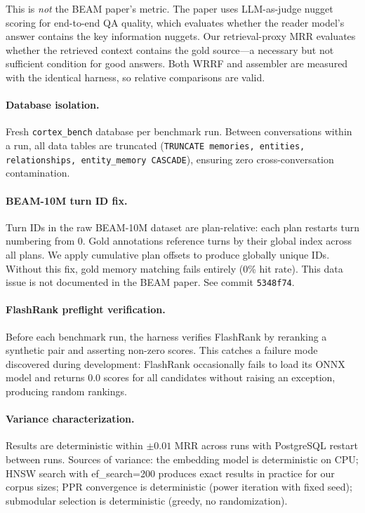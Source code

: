 \documentclass[11pt]{article}
\begin{document}
This is \emph{not} the BEAM paper's metric.  The paper uses
LLM-as-judge nugget scoring for end-to-end QA quality, which evaluates
whether the reader model's answer contains the key information nuggets.
Our retrieval-proxy MRR evaluates whether the retrieved context
contains the gold source---a necessary but not sufficient condition
for good answers.  Both WRRF and assembler are measured with the
identical harness, so relative comparisons are valid.

\paragraph{Database isolation.}
Fresh \texttt{cortex\_bench} database per benchmark run.  Between
conversations within a run, all data tables are truncated
(\texttt{TRUNCATE memories, entities, relationships, entity\_memory CASCADE}),
ensuring zero cross-conversation contamination.

\paragraph{BEAM-10M turn ID fix.}
Turn IDs in the raw BEAM-10M dataset are plan-relative: each plan
restarts turn numbering from 0.  Gold annotations reference turns by
their global index across all plans.  We apply cumulative plan offsets
to produce globally unique IDs.  Without this fix, gold memory
matching fails entirely (0\% hit rate).  This data issue is not
documented in the BEAM paper.  See commit \texttt{5348f74}.

\paragraph{FlashRank preflight verification.}
Before each benchmark run, the harness verifies FlashRank by reranking
a synthetic pair and asserting non-zero scores.  This catches a
failure mode discovered during development: FlashRank occasionally
fails to load its ONNX model and returns 0.0 scores for all
candidates without raising an exception, producing random rankings.

\paragraph{Variance characterization.}
Results are deterministic within $\pm 0.01$ MRR across runs with
PostgreSQL restart between runs.  Sources of variance: the embedding
model is deterministic on CPU; HNSW search with ef\_search=200
produces exact results in practice for our corpus sizes; PPR
convergence is deterministic (power iteration with fixed seed);
submodular selection is deterministic (greedy, no randomization).
\end{document}
